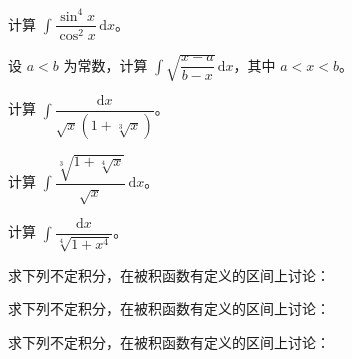 \newpage
\noindent\begin{minipage}{\textwidth}
计算 $\int\dfrac{\sin^4x}{\cos^2x}\,\mathrm dx$。
\end{minipage}\par\vfill
\noindent\begin{minipage}{\textwidth}
设 $a<b$ 为常数，计算 $\int\sqrt{\dfrac{x-a}{b-x}}\,\mathrm dx$，其中 $a<x<b$。
\end{minipage}\par\vfill
\noindent\begin{minipage}{\textwidth}
计算 $\int\dfrac{\mathrm dx}{\sqrt{x}(1+\sqrt[3]{x})}$。
\end{minipage}\par\vfill
\newpage
\noindent\begin{minipage}{\textwidth}
计算 $\int\dfrac{\sqrt[3]{1+\sqrt[4]{x}}}{\sqrt{x}}\,\mathrm dx$。
\end{minipage}\par\vfill
\noindent\begin{minipage}{\textwidth}
计算 $\int\dfrac{\mathrm dx}{\sqrt[4]{1+x^4}}$。
\end{minipage}\par\vfill
\noindent\begin{minipage}{\textwidth}
求下列不定积分，在被积函数有定义的区间上讨论：
\end{minipage}\par\vfill
\newpage
\noindent\begin{minipage}{\textwidth}
求下列不定积分，在被积函数有定义的区间上讨论：
\end{minipage}\par\vfill
\noindent\begin{minipage}{\textwidth}
求下列不定积分，在被积函数有定义的区间上讨论：
\end{minipage}\par\vfill
